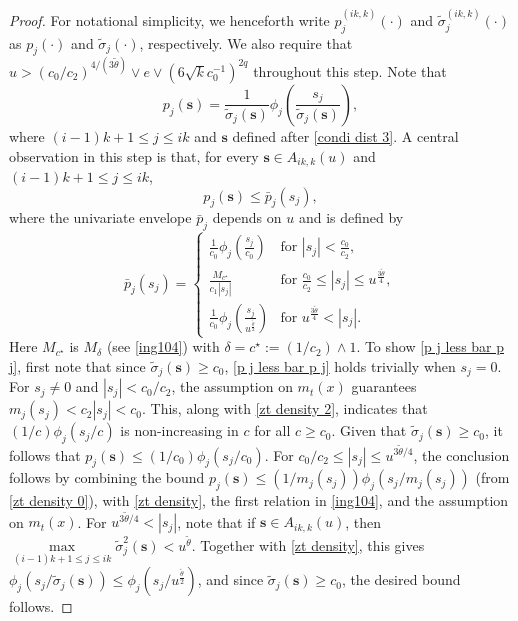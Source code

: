 \documentclass[ejsv2]{imsart}
\theoremstyle{plain}
\theoremstyle{definition}
\theoremstyle{remark}
\begin{document}
\begin{proof}
For notational simplicity, we henceforth write
$p^{(ik,k)}_j(\cdot)$ and $\tilde{\sigma}^{(ik,k)}_j(\cdot)$ as $p_j(\cdot)$ and $\tilde{\sigma}_j(\cdot)$, respectively.
We also require that $u>(c_0/c_2)^{4/(3\tilde{\theta})}\vee e \vee (6\sqrt{k}c_0^{-1})^{2q}$ throughout this step. 
Note that
$$p_j(\mathbf{s})=\frac{1}{\tilde{\sigma}_j(\mathbf{s})}\phi_j(\frac{s_j}{\tilde{\sigma}_j(\mathbf{s})}),$$
where $(i-1)k+1 \leq j\leq ik$
and $\mathbf{s}$ defined after \eqref{condi dist 3}.
A central observation in this step is that, for every $\mathbf{s}\in A_{ik,k}(u)$
and $(i-1)k+1 \leq j \leq ik$,
\begin{equation}\label{p j less bar p j}
p_j(\mathbf{s})\leq\bar{p}_j(s_j),
\end{equation}
where the univariate envelope
$\bar{p}_j$ depends on $u$ and is defined by
\begin{equation}\label{bar p j}
\bar{p}_j(s_j)= 
  \begin{cases}
    \frac{1}{c_0}\phi_j(\frac{s_j}{c_0}) & \mbox{for } |s_j|<\frac{c_0}{c_2}, \\
    \frac{M_{c^\star}}{c_1|s_j|} & \mbox{for } \frac{c_0}{c_2}\leq|s_j|\leq u^{\frac{3{\tilde{\theta}}}{4}}, \\
    \frac{1}{c_0}\phi_j(\frac{s_j}{u^{\frac{{\tilde{\theta}}}{2}}}) & \mbox{for } u^{\frac{3{\tilde{\theta}}}{4}}<|s_j|.
  \end{cases}
\end{equation}
Here $M_{c^\star}$ is $M_{\delta}$
(see \eqref{ing104}) with
$\delta=c^\star:=(1/c_2) \wedge 1$. 
To show \eqref{p j less bar p j}, first note that since
$\tilde{\sigma}_j(\mathbf{s})\geq c_0$,
\eqref{p j less bar p j} holds trivially
when $s_j=0$.
For $s_j\neq 0$ and
$|s_j|<c_0/c_2$, the assumption on $m_t(x)$
guarantees
$m_j(s_j)<c_2|s_j|<c_0$. This, along with \eqref{zt density 2}, indicates that $(1/c)\phi_j(s_j/c)$ is non-increasing in $c$ for all $c\geq c_0$. Given that $\tilde{\sigma}_j(\mathbf{s})\geq c_0$, it follows that $p_j(\mathbf{s})\leq(1/c_0)\phi_j(s_j/c_0)$. 
For $c_0/c_2
\leq|s_j|\leq u^{3{\tilde{\theta}}/4}$,
the conclusion follows by combining the bound
$p_j(\mathbf{s}) \leq (1/m_j(s_j))\phi_j(s_j/m_j(s_j))$
(from 
\eqref{zt density 0}),
with
\eqref{zt density}, the first relation in \eqref{ing104}, and the assumption on $m_t(x)$.
For $u^{3{\tilde{\theta}}/4}<|s_j|$, note that
if $\mathbf{s}\in A_{ik,k}(u)$, then
$\max\limits_{(i-1)k+1\leq j\leq ik}\tilde{\sigma}^2_{j}(\mathbf{s})<u^{\tilde{\theta}}$.
Together with \eqref{zt density},
this gives $\phi_j(s_j/\tilde{\sigma}_j(\mathbf{s}))\leq \phi_j(s_j/u^{\frac{{\tilde{\theta}}}{2}})$, and
since $\tilde{\sigma}_j(\mathbf{s})\geq c_0$,
the desired bound follows.



\end{proof}
\end{document}
